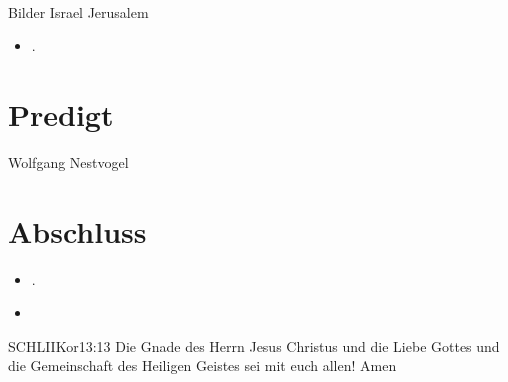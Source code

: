 \documentclass[fontsize=14pt]{mybib}
\begin{document}
\\
Bilder Israel Jerusalem


\begin{itemize}
    \item {}.
\end{itemize}
\section{Predigt}

    Wolfgang Nestvogel
\section{Abschluss}
\begin{itemize}
    \item {}.
    \item {}
\end{itemize}
\begin{bibelbox}{SCHL}{IIKor}{13:13}
    Die Gnade des Herrn Jesus Christus und die Liebe Gottes und die Gemeinschaft des Heiligen Geistes sei mit euch allen! Amen
\end{bibelbox}
\end{document}
